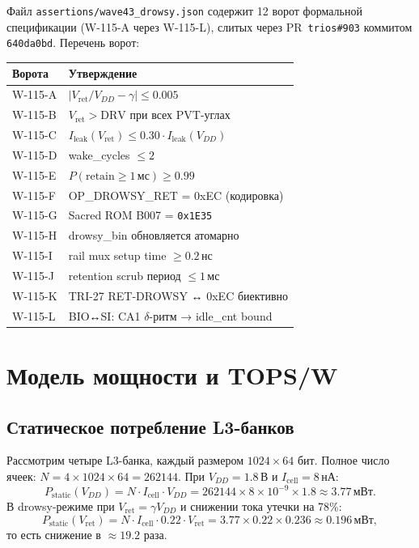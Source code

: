 Файл \texttt{assertions/wave43\_drowsy.json}
содержит 12 ворот формальной спецификации
(W-115-A через W-115-L),
слитых через PR~\texttt{trios\#903}
коммитом \texttt{640da0bd}.
Перечень ворот:
%
\begin{center}
\begin{tabular}{|l|l|}
  \hline
  \textbf{Ворота} & \textbf{Утверждение} \\
  \hline
  W-115-A & $|V_\mathrm{ret}/V_{DD} - \gamma| \leq 0.005$ \\
  W-115-B & $V_\mathrm{ret} > \mathrm{DRV}$ при всех PVT-углах \\
  W-115-C & $I_\mathrm{leak}(V_\mathrm{ret}) \leq 0.30 \cdot I_\mathrm{leak}(V_{DD})$ \\
  W-115-D & wake\_cycles $\leq 2$ \\
  W-115-E & $P(\text{retain} \geq 1\,\text{мс}) \geq 0.99$ \\
  W-115-F & OP\_DROWSY\_RET = 0xEC (кодировка) \\
  W-115-G & Sacred ROM B007 = \texttt{0x1E35} \\
  W-115-H & drowsy\_bin обновляется атомарно \\
  W-115-I & rail mux setup time $\geq 0.2\,\text{нс}$ \\
  W-115-J & retention scrub период $\leq 1\,\text{мс}$ \\
  W-115-K & TRI-27 RET-DROWSY ↔ 0xEC биективно \\
  W-115-L & BIO↔SI: CA1 $\delta$-ритм → idle\_cnt bound \\
  \hline
\end{tabular}
\end{center}

\section{Модель мощности и TOPS/W}
\label{sec:glava89-power}

\subsection{Статическое потребление L3-банков}

Рассмотрим четыре L3-банка, каждый размером $1024 \times 64$ бит.
Полное число ячеек: $N = 4 \times 1024 \times 64 = 262144$.
При $V_{DD} = 1.8\,\text{В}$ и $I_\mathrm{cell} = 8\,\text{нА}$:
%
\begin{equation}
  P_\mathrm{static}(V_{DD}) = N \cdot I_\mathrm{cell} \cdot V_{DD}
  = 262144 \times 8 \times 10^{-9} \times 1.8
  \approx 3.77\,\text{мВт}.
  \label{eq:pstatic-vdd}
\end{equation}
%
В drowsy-режиме при $V_\mathrm{ret} = \gamma V_{DD}$
и снижении тока утечки на 78\%:
%
\begin{equation}
  P_\mathrm{static}(V_\mathrm{ret})
  = N \cdot I_\mathrm{cell} \cdot 0.22 \cdot V_\mathrm{ret}
  = 3.77 \times 0.22 \times 0.236
  \approx 0.196\,\text{мВт},
  \label{eq:pstatic-vret}
\end{equation}
%
то есть снижение в $\approx 19.2$ раза.

